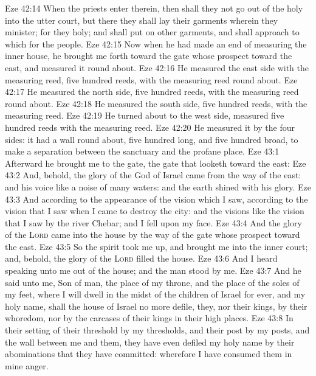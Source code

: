 \vs Eze 42:14 When the priests enter therein, then shall they not go out of the holy  into the utter court, but there they shall lay their garments wherein they minister; for they  holy; and shall put on other garments, and shall approach to  which  for the people.
\vs Eze 42:15 Now when he had made an end of measuring the inner house, he brought me forth toward the gate whose prospect  toward the east, and measured it round about.
\vs Eze 42:16 He measured the east side with the measuring reed, five hundred reeds, with the measuring reed round about.
\vs Eze 42:17 He measured the north side, five hundred reeds, with the measuring reed round about.
\vs Eze 42:18 He measured the south side, five hundred reeds, with the measuring reed.
\vs Eze 42:19 He turned about to the west side,  measured five hundred reeds with the measuring reed.
\vs Eze 42:20 He measured it by the four sides: it had a wall round about, five hundred  long, and five hundred broad, to make a separation between the sanctuary and the profane place.
\vs Eze 43:1 Afterward he brought me to the gate,  the gate that looketh toward the east:
\vs Eze 43:2 And, behold, the glory of the God of Israel came from the way of the east: and his voice  like a noise of many waters: and the earth shined with his glory.
\vs Eze 43:3 And  according to the appearance of the vision which I saw,  according to the vision that I saw when I came to destroy the city: and the visions  like the vision that I saw by the river Chebar; and I fell upon my face.
\vs Eze 43:4 And the glory of the \textsc{Lord} came into the house by the way of the gate whose prospect  toward the east.
\vs Eze 43:5 So the spirit took me up, and brought me into the inner court; and, behold, the glory of the \textsc{Lord} filled the house.
\vs Eze 43:6 And I heard  speaking unto me out of the house; and the man stood by me.
\vs Eze 43:7 And he said unto me, Son of man, the place of my throne, and the place of the soles of my feet, where I will dwell in the midst of the children of Israel for ever, and my holy name, shall the house of Israel no more defile,  they, nor their kings, by their whoredom, nor by the carcases of their kings in their high places.
\vs Eze 43:8 In their setting of their threshold by my thresholds, and their post by my posts, and the wall between me and them, they have even defiled my holy name by their abominations that they have committed: wherefore I have consumed them in mine anger.
